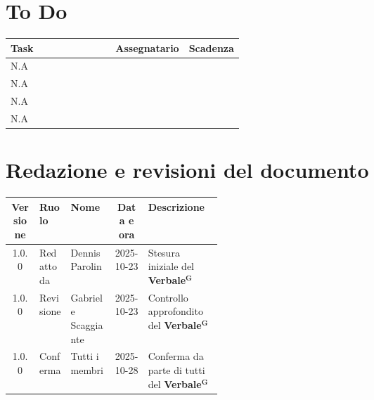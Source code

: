 \documentclass[a4paper,12pt]{article}
\newcommand{\term}[1]{\textbf{#1}$^\mathbf{G}$}
\begin{document}
\section{To Do}

\begin{center}
\small
\renewcommand{\arraystretch}{1.2}
\begin{tabular}{|>{\raggedright\arraybackslash}p{0.45\linewidth}|c|c|}
\hline
\rowcolor{gray!60}
\textbf{Task} & \textbf{Assegnatario} & \textbf{Scadenza} \\
\hline
\rowcolor{white}
N.A &  &  \\
\hline
\rowcolor{gray!20}
N.A &  &  \\
\hline
\rowcolor{white}
N.A &  &  \\
\hline
\rowcolor{gray!20}
N.A &  &  \\
\hline
\end{tabular}
\end{center}

\clearpage
\section{Redazione e revisioni del documento}

\begin{center}
\small
\renewcommand{\arraystretch}{1.2}
\begin{tabular}{|c|l|l|c|>{\raggedright\arraybackslash}p{0.35\linewidth}|}
\hline
\rowcolor{gray!60}
\textbf{Versione} & \textbf{Ruolo} & \textbf{Nome} & \textbf{Data e ora} & \textbf{Descrizione} \\
\hline
\rowcolor{white}
1.0.0 & Redatto da & Dennis Parolin & 2025-10-23 & Stesura iniziale del \term{Verbale} \\
\hline
\rowcolor{gray!20}
1.0.0 & Revisione & Gabriele Scaggiante & 2025-10-23 & Controllo approfondito del \term{Verbale} \\
\hline
\rowcolor{white}
1.0.0 & Conferma & Tutti i membri & 2025-10-28 & Conferma da parte di tutti del \term{Verbale} \\
\hline
\end{tabular}
\end{center}


\end{document}

